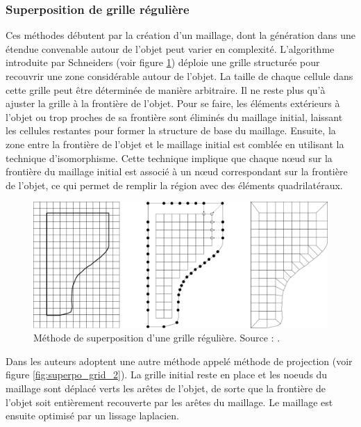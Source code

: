 \subsubsection{Superposition de grille régulière}

Ces méthodes débutent par la création d'un maillage, dont la génération dans une étendue convenable autour de l'objet peut varier en complexité. L'algorithme introduite par Schneiders \cite{schneiders1996grid} (voir figure \ref{fig:superpo_grid_1}) déploie une grille structurée pour recouvrir une zone considérable autour de l'objet. La taille de chaque cellule dans cette grille peut être déterminée de manière arbitraire. Il ne reste plus qu'à ajuster la grille à la frontière de l'objet. Pour se faire, les éléments extérieurs à l'objet ou trop proches de sa frontière sont éliminés du maillage initial, laissant les cellules restantes pour former la structure de base du maillage. Ensuite, la zone entre la frontière de l'objet et le maillage initial est comblée en utilisant la technique d'isomorphisme. Cette technique implique que chaque nœud sur la frontière du maillage initial est associé à un nœud correspondant sur la frontière de l'objet, ce qui permet de remplir la région avec des éléments quadrilatéraux.

 \begin{figure}[!h]
    \centering
    \includegraphics[scale=0.4]{images/superpo_grid_1.png}
    \caption{Méthode de superposition d'une grille régulière. Source : \cite{schneiders1996grid}.}
    \label{fig:superpo_grid_1}
\end{figure}

Dans \cite{taghavi1994automatic, ives1995geometric} les auteurs adoptent une autre méthode appelé méthode de projection  (voir figure \ref{fig:superpo_grid_2}). La grille initial reste en place et les noeuds du maillage sont déplacé verts les arêtes de l'objet, de sorte que la frontière de l'objet soit entièrement recouverte par les arêtes du maillage. Le maillage est ensuite optimisé par un lissage laplacien.


